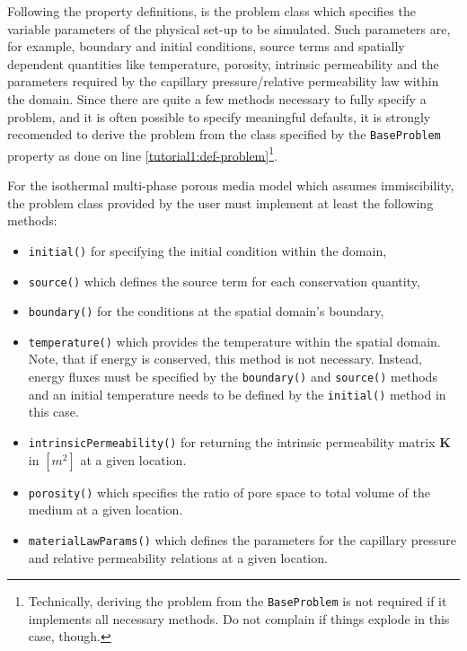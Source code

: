 Following the property definitions, is the problem class which
specifies the variable parameters of the physical set-up to be
simulated. Such parameters are, for example, boundary and initial
conditions, source terms and spatially dependent quantities like
temperature, porosity, intrinsic permeability and the parameters
required by the capillary pressure/relative permeability law within
the domain. Since there are quite a few methods necessary to fully
specify a problem, and it is often possible to specify meaningful
defaults, it is strongly recomended to derive the problem from the
class specified by the \texttt{BaseProblem} property as done on line
\ref{tutorial1:def-problem}\footnote{Technically, deriving the problem
  from the \texttt{BaseProblem} is not required if it implements all
  necessary methods. Do not complain if things explode in this case,
  though.}.

For the isothermal multi-phase porous media model which assumes
immiscibility, the problem class provided by the user must implement
at least the following methods:
\begin{itemize}
\item \texttt{initial()} for specifying the initial condition within
  the domain,
\item \texttt{source()} which defines the source term for each conservation quantity,
\item \texttt{boundary()} for the conditions at the spatial domain's
  boundary,
\item \texttt{temperature()} which provides the temperature within the
  spatial domain. Note, that if energy is conserved, this method is
  not necessary. Instead, energy fluxes must be specified by the
  \texttt{boundary()} and \texttt{source()} methods and an initial
  temperature needs to be defined by the \texttt{initial()} method in
  this case.
\item \texttt{intrinsicPermeability()} for returning the intrinsic
  permeability matrix $\mathbf{K}$ in $[m^2]$ at a given location.
\item \texttt{porosity()} which specifies the ratio of pore space to
  total volume of the medium at a given location.
\item \texttt{materialLawParams()} which defines the parameters for
  the capillary pressure and relative permeability relations at a
  given location.
\end{itemize}

